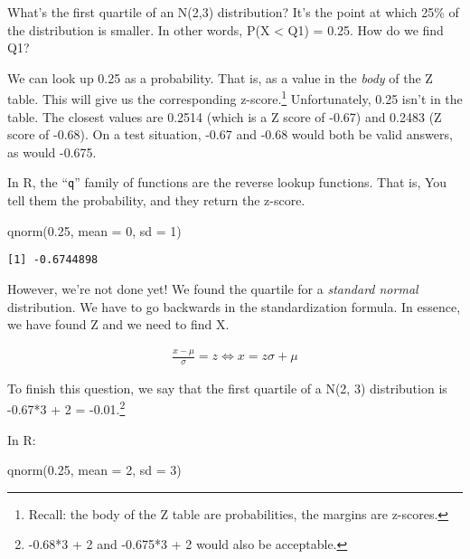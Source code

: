 \documentclass[
  letterpaper,
  DIV=11,
  numbers=noendperiod]{scrreprt}
\newenvironment{Shaded}{\begin{snugshade}}{\end{snugshade}}
\newcommand{\AttributeTok}[1]{\textcolor[rgb]{0.40,0.45,0.13}{#1}}
\newcommand{\DecValTok}[1]{\textcolor[rgb]{0.68,0.00,0.00}{#1}}
\newcommand{\FloatTok}[1]{\textcolor[rgb]{0.68,0.00,0.00}{#1}}
\newcommand{\FunctionTok}[1]{\textcolor[rgb]{0.28,0.35,0.67}{#1}}
\newcommand{\NormalTok}[1]{\textcolor[rgb]{0.00,0.23,0.31}{#1}}
\begin{document}
What's the first quartile of an N(2,3) distribution? It's the point at
which 25\% of the distribution is smaller. In other words, P(X
\textless{} Q1) = 0.25. How do we find Q1?

We can look up 0.25 as a probability. That is, as a value in the
\emph{body} of the Z table. This will give us the corresponding
z-score.\footnote{Recall: the body of the Z table are probabilities, the
  margins are z-scores.} Unfortunately, 0.25 isn't in the table. The
closest values are 0.2514 (which is a Z score of -0.67) and 0.2483 (Z
score of -0.68). On a test situation, -0.67 and -0.68 would both be
valid answers, as would -0.675.

In R, the ``\texttt{q}'' family of functions are the reverse lookup
functions. That is, You tell them the probability, and they return the
z-score.

\begin{Shaded}
\begin{Highlighting}[]
\FunctionTok{qnorm}\NormalTok{(}\FloatTok{0.25}\NormalTok{, }\AttributeTok{mean =} \DecValTok{0}\NormalTok{, }\AttributeTok{sd =} \DecValTok{1}\NormalTok{)}
\end{Highlighting}
\end{Shaded}

\begin{verbatim}
[1] -0.6744898
\end{verbatim}

However, we're not done yet! We found the quartile for a \emph{standard
normal} distribution. We have to go backwards in the standardization
formula. In essence, we have found Z and we need to find X.

\begin{align*}
\frac{x - \mu}{\sigma} = z \Leftrightarrow x = z\sigma + \mu
\end{align*}

To finish this question, we say that the first quartile of a N(2, 3)
distribution is -0.67*3 + 2 = -0.01.\footnote{-0.68*3 + 2 and -0.675*3 +
  2 would also be acceptable.}

In R:

\begin{Shaded}
\begin{Highlighting}[]
\FunctionTok{qnorm}\NormalTok{(}\FloatTok{0.25}\NormalTok{, }\AttributeTok{mean =} \DecValTok{2}\NormalTok{, }\AttributeTok{sd =} \DecValTok{3}\NormalTok{)}
\end{Highlighting}
\end{Shaded}
\end{document}
